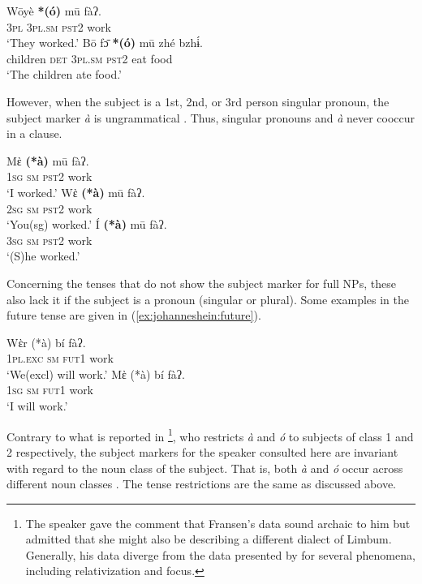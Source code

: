 \documentclass[output=paper]{langscibook}
\begin{document}
\ea\label{ex:johanneshein:pluralSM}
\begin{xlist}
\ex 
\gll Wōyè \textbf{*(ó)} mū fàʔ.\label{ex:johanneshein:3pl-pron-insitu}\\
\textsc{3pl} \hphantom{(*}\textsc{3pl.sm} \textsc{pst2} work\\
\glt `They worked.'
\ex
\gll Bō fɔ̄ \textbf{*(ó)} mū zhé bzhɨ́.\label{ex:johanneshein:3pl-np-insitu}\\
children \textsc{det} \hphantom{(*}\textsc{3pl.sm} \textsc{pst2} eat food\\
\glt `The children ate food.'
\end{xlist}
\z 
However, when the subject is a 1st, 2nd, or 3rd person singular
pronoun, the subject marker \textit{à} is ungrammatical . Thus,
singular pronouns and \textit{à} never cooccur in a clause.\largerpage

\ea\label{ex:johanneshein:singularSM}
\begin{xlist}
\ex 
\gll Mὲ \textbf{(*à)} mū fàʔ.\label{ex:johanneshein:singularSMa}\\
\textsc{1sg} \hphantom{(*}\textsc{sm} \textsc{pst2} work\\
\glt `I worked.'
\ex
\gll Wὲ \textbf{(*à)} mū fàʔ.\label{ex:johanneshein:singularSMb}\\
\textsc{2sg} \hphantom{(*}\textsc{sm} \textsc{pst2} work\\
\glt `You(sg) worked.'
\ex
\gll Í \textbf{(*à)} mū fàʔ.\label{ex:johanneshein:singularSMc}\\
\textsc{3sg} \hphantom{(*}\textsc{sm} \textsc{pst2} work\\
\glt `(S)he worked.'
\end{xlist}
\z 
Concerning the tenses that do not show the subject marker for full
NPs, these also lack it if the subject is a pronoun
(singular or plural). Some examples in the future tense are given in (\ref{ex:johanneshein:future}).

\ea\label{ex:johanneshein:future}
\begin{xlist}
\ex 
\gll Wὲr (*{à}) bí fàʔ.\\
\textsc{1pl.exc} \hphantom{(*}\textsc{sm} \textsc{fut1} work\\
\glt `We(excl) will work.'
\ex 
\gll Mὲ (*{à}) bí fàʔ.\\
\textsc{1sg} \hphantom{(*}\textsc{sm} \textsc{fut1} work\\
\glt `I will work.'
\end{xlist}
\z 
Contrary to what is reported in \citet{fransen95}\footnote{The speaker gave the comment that Fransen's data sound archaic to him but admitted that she might also be describing a different dialect of Limbum. Generally, his data diverge from the data presented by \citet{fransen95} for several phenomena, including relativization and focus.}, who restricts \textit{à} and \textit{ó} to subjects of class 1 and 2 respectively, the subject markers for the speaker consulted here are invariant with regard to the noun class of the subject. That is, both \textit{à} and \textit{ó} occur across different noun classes . The tense restrictions are the same as discussed above.  
\end{document}
